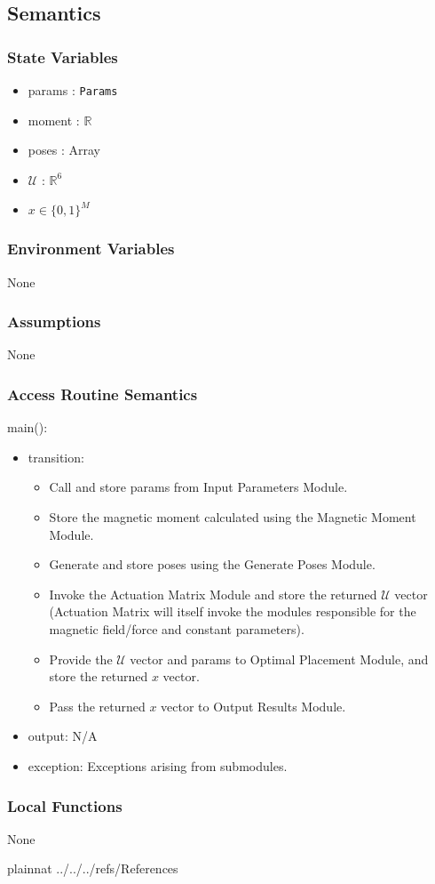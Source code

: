 \documentclass[12pt, titlepage]{article}
\begin{document}
\subsection{Semantics}

\subsubsection{State Variables}
\begin{itemize}
  \item params : \texttt{Params}
  \item moment : $\mathbb{R}$
  \item poses : Array
  \item $\mathcal{U}$ : $\mathbb{R}^6$
  \item $x \in \{0, 1 \}^{M}$
\end{itemize}

\subsubsection{Environment Variables}
None 

\subsubsection{Assumptions}
None 

\subsubsection{Access Routine Semantics}

\noindent main():
\begin{itemize}
\item transition: 
\begin{itemize}
  \item Call and store params from Input Parameters Module. 
  \item Store the magnetic moment calculated using the Magnetic Moment Module. 
  \item Generate and store poses using the Generate Poses Module.   
  \item Invoke the Actuation Matrix Module and store the returned $\mathcal{U}$ vector (Actuation Matrix will itself invoke the modules responsible for the magnetic field/force and constant parameters).
  \item Provide the $\mathcal{U}$ vector and params to Optimal Placement Module, and store the returned $x$ vector. 
  \item Pass the returned $x$ vector to Output Results Module. 
\end{itemize}
\item output: N/A
\item exception: Exceptions arising from submodules.
\end{itemize}


\subsubsection{Local Functions}
None

\newpage

 {plainnat}
 {../../../refs/References}
\end{document}
